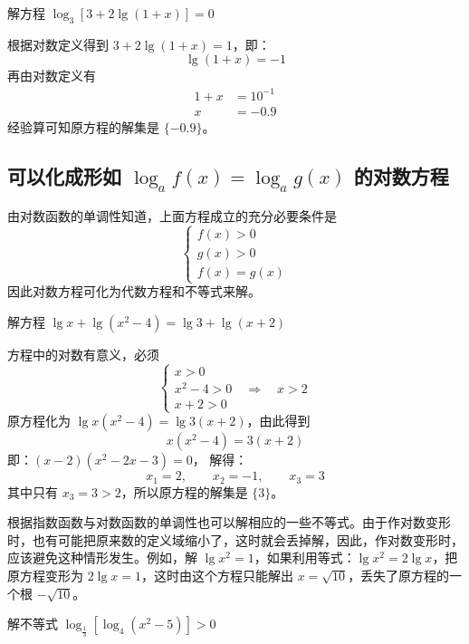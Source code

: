 \begin{example}
解方程 $\log_3[3+2\lg(1+x)]=0$
\end{example}

\begin{solution}
根据对数定义得到 $3+2\lg(1+x)=1$，即：
\[\lg(1+x)=-1\]
再由对数定义有
\[\begin{split}
  1+x&=10^{-1}\\
  x&=-0.9
\end{split}\]  
经验算可知原方程的解集是 $\{-0.9\}$。
\end{solution}

\subsection{可以化成形如 $\log_a f(x)=\log_a g(x)$ 的对数方程}

由对数函数的单调性知道，上面方程成立的充分必要条件是
\[\begin{cases}
  f(x)>0\\
  g(x)>0\\
  f(x)=g(x)
\end{cases}\]
因此对数方程可化为代数方程和不等式来解。

\begin{example}
解方程 $\lg x+\lg(x^2-4)=\lg3+\lg(x+2)$
\end{example}

\begin{solution}
方程中的对数有意义，必须
\[\begin{cases}
  x>0\\
  x^2-4>0\quad \Rightarrow\quad  x>2\\
  x+2>0
\end{cases}\]
原方程化为 $\lg x(x^2-4)=\lg 3(x+2)$，由此得到
\[x(x^2-4)=3(x+2)\]
即：$(x-2)(x^2-2x-3)=0$，
解得：
\[x_1=2,\qquad x_2=-1,\qquad x_3=3\]
其中只有 $x_3=3>2$，所以原方程的解集是 $\{3\}$。
\end{solution}

根据指数函数与对数函数的单调性也可以解相应的一些不等式。由于作对数变形时，也有可能把原来数的定义域缩小了，这时就会丢掉解，因此，作对数变形时，应该避免这种情形发生。例如，解 $\lg x^2=1$，如果利用等式：$\lg x^2=2\lg x$，把原方程变形为 $2\lg x=1$，这时由这个方程只能解出 $x=\sqrt{10}$，丢失了原方程的一个根 $-\sqrt{10}$。

\begin{example}
  解不等式 $\log_{\tfrac{1}{3}}[\log_4 (x^2-5)]>0$
\end{example}

